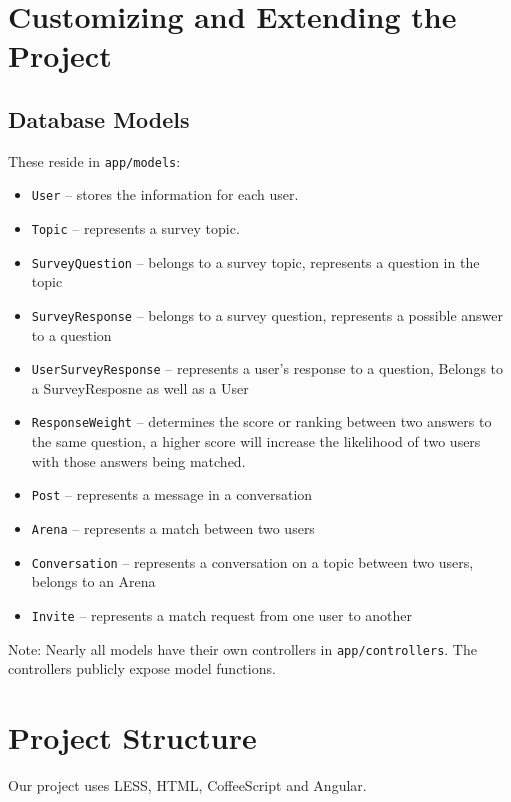 \documentclass[12pt]{article}
\begin{document}
\section{Customizing and Extending the Project}

\subsection{Database Models}
These reside in \texttt{app/models}:
\begin{itemize}
    \item \texttt{User} -- stores the information for each user.
    \item \texttt{Topic} -- represents a survey topic.
    \item \texttt{SurveyQuestion} -- belongs to a survey topic, represents a question in the topic
    \item \texttt{SurveyResponse} -- belongs to a survey question, represents a possible answer to a question
    \item \texttt{UserSurveyResponse} -- represents a user's response to a question, Belongs to a SurveyResposne as well as a User
    \item \texttt{ResponseWeight} -- determines the score or ranking between two answers to the same question, a higher score will increase the likelihood of two users with those answers being matched.
    \item \texttt{Post} -- represents a message in a conversation
    \item \texttt{Arena} -- represents a match between two users
    \item \texttt{Conversation} -- represents a conversation on a topic between two users, belongs to an Arena
    \item \texttt{Invite} -- represents a match request from one user to another
\end{itemize}

Note: Nearly all models have their own controllers in \texttt{app/controllers}.
The controllers publicly expose model functions.

\section{Project Structure}
Our project uses LESS, HTML, CoffeeScript and Angular.
\end{document}
